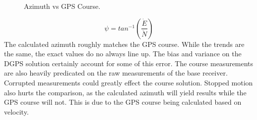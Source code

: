 \documentclass[11pt]{article}
\begin{document}
\begin{enumerate}[label=\textbf{\arabic*.}]
\begin{figure}[H]
        \caption{Azimuth vs GPS Course.}
      \end{figure}
      \begin{equation}
        \psi=tan^{-1}\left({\dfrac{\dot{E}}{\dot{N}}}\right)
      \end{equation}
      The calculated azimuth roughly matches the GPS course. While the trends are the same, 
      the exact values do no always line up. The bias and variance on the DGPS solution 
      certainly account for some of this error. The course measurements are also heavily 
      predicated on the raw measurements of the base receiver. Corrupted measurements could 
      greatly effect the course solution. Stopped motion also hurts the comparison, as the 
      calculated azimuth will yield results while the GPS course will not. This is due to 
      the GPS course being calculated based on velocity.
    

\end{enumerate}
\end{document}
